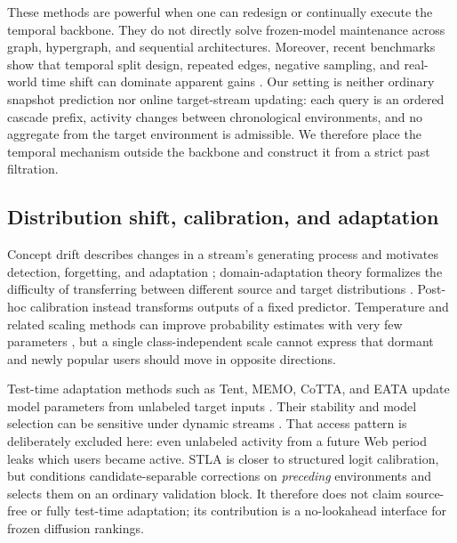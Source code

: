\documentclass[sigconf,anonymous,review]{acmart}
\newcommand{\method}{\textsc{STLA}\xspace}
\begin{document}
These methods are powerful when one can redesign or continually execute the temporal backbone. They do not directly solve frozen-model maintenance across graph, hypergraph, and sequential architectures. Moreover, recent benchmarks show that temporal split design, repeated edges, negative sampling, and real-world time shift can dominate apparent gains \cite{poursafaei2022better,huang2023tgb,yao2022wildtime}. Our setting is neither ordinary snapshot prediction nor online target-stream updating: each query is an ordered cascade prefix, activity changes between chronological environments, and no aggregate from the target environment is admissible. We therefore place the temporal mechanism outside the backbone and construct it from a strict past filtration.

\subsection{Distribution shift, calibration, and adaptation}
Concept drift describes changes in a stream's generating process and motivates detection, forgetting, and adaptation \cite{gama2014survey,webb2016drift}; domain-adaptation theory formalizes the difficulty of transferring between different source and target distributions \cite{bendavid2010domains}. Post-hoc calibration instead transforms outputs of a fixed predictor. Temperature and related scaling methods can improve probability estimates with very few parameters \cite{niculescu2005probabilities,guo2017calibration}, but a single class-independent scale cannot express that dormant and newly popular users should move in opposite directions.

Test-time adaptation methods such as Tent, MEMO, CoTTA, and EATA update model parameters from unlabeled target inputs \cite{wang2021tent,zhang2022memo,wang2022cotta,niu2022eata}. Their stability and model selection can be sensitive under dynamic streams \cite{niu2023sar,zhao2023pitfalls}. That access pattern is deliberately excluded here: even unlabeled activity from a future Web period leaks which users became active. \method is closer to structured logit calibration, but conditions candidate-separable corrections on \emph{preceding} environments and selects them on an ordinary validation block. It therefore does not claim source-free or fully test-time adaptation; its contribution is a no-lookahead interface for frozen diffusion rankings.
\end{document}
